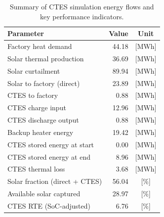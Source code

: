 \renewcommand{\arraystretch}{1.2}
\begin{table}[h]
\centering
\begin{tabular}{l|r c}
\hline
Parameter & Value & Unit \\
\hline
Factory heat demand & 44.18 & [MWh] \\
Solar thermal production & 36.69 & [MWh] \\
Solar curtailment & 89.94 & [MWh] \\
Solar to factory (direct) & 23.89 & [MWh] \\
CTES to factory & 0.88 & [MWh] \\
CTES charge input & 12.96 & [MWh] \\
CTES discharge output & 0.88 & [MWh] \\
Backup heater energy & 19.42 & [MWh] \\
CTES stored energy at start & 0.00 & [MWh] \\
CTES stored energy at end & 8.96 & [MWh] \\
CTES thermal loss & 3.68 & [MWh] \\
\hline
Solar fraction (direct + CTES) & 56.04 & [\%] \\
Available solar captured & 28.97 & [\%] \\
CTES RTE (SoC-adjusted) & 6.76 & [\%] \\
\hline
\end{tabular}
\caption{Summary of CTES simulation energy flows and key performance indicators.}
\label{tab:ctes-simulation-summary}
\end{table}
